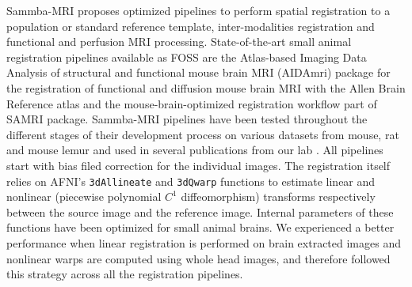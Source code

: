 \documentclass[utf8, a4paper, final, crop]{frontiersSCNS}
\newcommand{\bashinline}[1]{\texttt{#1}}
\begin{document}
Sammba-MRI proposes optimized pipelines to perform spatial registration
to a population or standard reference template, inter-modalities
registration and functional and perfusion MRI processing.
State-of-the-art small animal registration pipelines available as FOSS
are the Atlas-based Imaging Data Analysis of structural and functional mouse
brain MRI (AIDAmri) \citep{pallast2019processing} package for the registration of functional and diffusion
mouse brain MRI with the Allen Brain Reference atlas and
the mouse-brain-optimized registration workflow \citep{ioanas2019optimized}
part of SAMRI package. 
Sammba-MRI pipelines have been tested throughout the different stages of their
development process on various datasets from mouse, rat and mouse lemur
and used in several publications from our lab \citep{garin2018resting, nadkarni20193d, garin2019resting}.
All pipelines start with bias filed correction for the individual images.
The registration itself relies on AFNI's \bashinline{3dAllineate} and \bashinline{3dQwarp} functions to 
estimate linear and nonlinear (piecewise polynomial $C^1$ diffeomorphism) transforms respectively between the source image
and the reference image. Internal parameters of these functions have been optimized for
small animal brains.
We experienced a better performance when linear registration
is performed on brain extracted images and nonlinear warps are computed
using whole head images, and therefore followed this strategy across all the 
registration pipelines.
\end{document}
